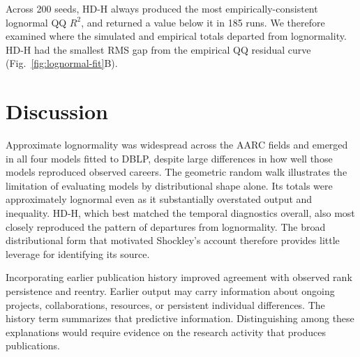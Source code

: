 \documentclass[9pt,twocolumn,twoside]{pnas-new}
\begin{document}
Across 200 seeds, HD-H always produced the most empirically-consistent lognormal QQ $R^2$, and returned a value below it in 185 runs. We therefore examined where the simulated and empirical totals departed
from lognormality. HD-H had the smallest RMS gap from the empirical
QQ residual curve (Fig.~\ref{fig:lognormal-fit}B).

\section*{Discussion}

Approximate lognormality was widespread across the AARC fields and
emerged in all four models fitted to DBLP, despite large differences
in how well those models reproduced observed careers. The geometric
random walk illustrates the limitation of evaluating models by
distributional shape alone. Its totals were approximately lognormal
even as it substantially overstated output and inequality. HD-H,
which best matched the temporal diagnostics overall, also most
closely reproduced the pattern of departures from lognormality.
The broad distributional form that motivated Shockley's account
therefore provides little leverage for identifying its source.

Incorporating earlier publication history improved agreement with
observed rank persistence and reentry. Earlier output may carry
information about ongoing projects, collaborations, resources, or
persistent individual differences. The history term summarizes that
predictive information. Distinguishing among these explanations
would require evidence on the research activity that produces
publications.







\showmatmethods{} %


\showacknow{} %

\bibsplit[4]


\end{document}
